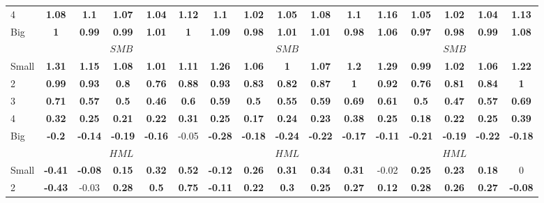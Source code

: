 \begin{table}[H]
\begin{tabular}{lccccc|ccccc|ccccc}
4 & \textbf{1.08} & \textbf{1.1} & \textbf{1.07} & \textbf{1.04} & \textbf{1.12} & \textbf{1.1} & \textbf{1.02} & \textbf{1.05} & \textbf{1.08} & \textbf{1.1} & \textbf{1.16} & \textbf{1.05} & \textbf{1.02} & \textbf{1.04} & \textbf{1.13} \\
Big & \textbf{1} & \textbf{0.99} & \textbf{0.99} & \textbf{1.01} & \textbf{1} & \textbf{1.09} & \textbf{0.98} & \textbf{1.01} & \textbf{1.01} & \textbf{0.98} & \textbf{1.06} & \textbf{0.97} & \textbf{0.98} & \textbf{0.99} & \textbf{1.08} \\
 & \multicolumn{5}{c|}{$SMB$} & \multicolumn{5}{c|}{$SMB$} & \multicolumn{5}{c}{$SMB$} \\
Small & \textbf{1.31} & \textbf{1.15} & \textbf{1.08} & \textbf{1.01} & \textbf{1.11} & \textbf{1.26} & \textbf{1.06} & \textbf{1} & \textbf{1.07} & \textbf{1.2} & \textbf{1.29} & \textbf{0.99} & \textbf{1.02} & \textbf{1.06} & \textbf{1.22} \\
2 & \textbf{0.99} & \textbf{0.93} & \textbf{0.8} & \textbf{0.76} & \textbf{0.88} & \textbf{0.93} & \textbf{0.83} & \textbf{0.82} & \textbf{0.87} & \textbf{1} & \textbf{0.92} & \textbf{0.76} & \textbf{0.81} & \textbf{0.84} & \textbf{1} \\
3 & \textbf{0.71} & \textbf{0.57} & \textbf{0.5} & \textbf{0.46} & \textbf{0.6} & \textbf{0.59} & \textbf{0.5} & \textbf{0.55} & \textbf{0.59} & \textbf{0.69} & \textbf{0.61} & \textbf{0.5} & \textbf{0.47} & \textbf{0.57} & \textbf{0.69} \\
4 & \textbf{0.32} & \textbf{0.25} & \textbf{0.21} & \textbf{0.22} & \textbf{0.31} & \textbf{0.25} & \textbf{0.17} & \textbf{0.24} & \textbf{0.23} & \textbf{0.38} & \textbf{0.25} & \textbf{0.18} & \textbf{0.22} & \textbf{0.25} & \textbf{0.39} \\
Big & \textbf{-0.2} & \textbf{-0.14} & \textbf{-0.19} & \textbf{-0.16} & -0.05 & \textbf{-0.28} & \textbf{-0.18} & \textbf{-0.24} & \textbf{-0.22} & \textbf{-0.17} & \textbf{-0.11} & \textbf{-0.21} & \textbf{-0.19} & \textbf{-0.22} & \textbf{-0.18} \\
 & \multicolumn{5}{c|}{$HML$} & \multicolumn{5}{c|}{$HML$} & \multicolumn{5}{c}{$HML$} \\
Small & \textbf{-0.41} & \textbf{-0.08} & \textbf{0.15} & \textbf{0.32} & \textbf{0.52} & \textbf{-0.12} & \textbf{0.26} & \textbf{0.31} & \textbf{0.34} & \textbf{0.31} & -0.02 & \textbf{0.25} & \textbf{0.23} & \textbf{0.18} & 0 \\
2 & \textbf{-0.43} & -0.03 & \textbf{0.28} & \textbf{0.5} & \textbf{0.75} & \textbf{-0.11} & \textbf{0.22} & \textbf{0.3} & \textbf{0.25} & \textbf{0.27} & \textbf{0.12} & \textbf{0.28} & \textbf{0.26} & \textbf{0.27} & \textbf{-0.08} \\

\end{tabular}
\end{table}
